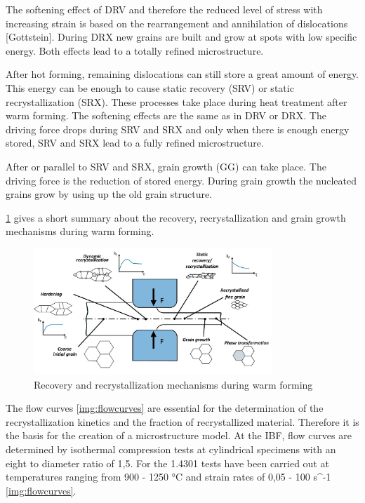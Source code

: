 The softening effect of DRV and therefore the reduced level of stress with increasing strain is based on the rearrangement and annihilation of dislocations [Gottstein]. During DRX new grains are built and grow at spots with low specific energy. Both effects lead to a totally refined microstructure.\par

After hot forming, remaining dislocations can still store a great amount of energy. This energy can be enough to cause static recovery (SRV) or static recrystallization (SRX). These processes take place during heat treatment after warm forming. The softening effects are the same as in DRV or DRX. The driving force drops during SRV and SRX and only when there is enough energy stored, SRV and SRX lead to a fully refined microstructure.\par 

After or parallel to SRV and SRX, grain growth (GG) can take place. The driving force is the reduction of stored energy. During grain growth the nucleated grains grow by using up the old grain structure.\par 

\ref{img:recovandrecrystwarmforming} gives a short summary about the recovery, recrystallization and grain growth mechanisms during warm forming.

\begin{figure}[htbp]
 \centering
 \includegraphics[width=0.8\textwidth]{images/recovandrecrystwarmforming}
 \caption{Recovery and recrystallization mechanisms during warm forming}
 \label{img:recovandrecrystwarmforming}
\end{figure}

The flow curves \ref{img:flowcurves} are essential for the determination of the recrystallization kinetics and the fraction of recrystallized material. Therefore it is the basis for the creation of a microstructure model. At the IBF, flow curves are determined by isothermal compression tests at cylindrical specimens with an eight to diameter ratio of 1,5. For the 1.4301 tests have been carried out at temperatures ranging from 900 - 1250 °C and strain rates of 0,05 - 100 s^{-1} \ref{img:flowcurves}.

